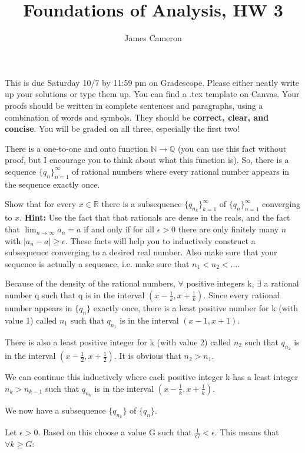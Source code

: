 \documentclass[answers]{exam}
\title{Foundations of Analysis, HW 3}
\author{James Cameron}
\date{}
\theoremstyle{remark}
\theoremstyle{definition}
\newcommand{\NN}{\mathbb{N}}
\newcommand{\RR}{\mathbb{R}}
\newcommand{\QQ}{\mathbb{Q}}
\begin{document}
This is due Saturday 10/7 by 11:59 pm on Gradescope. Please either neatly write up your solutions or type them up. You can find a .tex template on Canvas. Your proofs should be written in complete sentences and paragraphs, using a combination of words and symbols. They should be \textbf{correct, clear, and concise}. You will be graded on all three, especially the first two!

\noindent


\begin{questions}

\question There is a one-to-one and onto function $\NN \to \QQ$ (you can use this fact without proof, but I encourage you to think about what this function is). So, there is a sequence $\{q_n\}_{n=1}^{\infty}$ of rational numbers where every rational number appears in the sequence exactly once. 

Show that for every $x \in \RR$ there is a subsequence $\{q_{n_k}\}_{k=1}^{\infty}$ of $\{q_n\}_{n=1}^{\infty}$ converging to $x$. \textbf{Hint:} Use the fact that that rationals are dense in the reals, and the fact that $\lim_{ n \to \infty} a_n=a$ if and only if for all $\epsilon>0$ there are only finitely many $n$ with $|a_n-a|\ge \epsilon$. These facts will help you  to inductively construct a subsequence converging to a desired real number. Also make sure that your sequence is actually a sequence, i.e. make sure that $n_1<n_2< \dots$.

\begin{solution}

Because of the density of the rational numbers,
$\forall$ positive integers k, $\exists$ a rational number
q such that q is in the interval $(x - \frac{1}{k}, x + \frac{1}{k})$.
Since every rational number appears in $\{q_n\}$ exactly once,
there is a least positive number for k (with value 1) called $n_1$ such that
$q_{n_1}$ is in the interval $(x-1, x+1)$.

There is also a least positive integer for k (with value 2)
called $n_2$ such that $q_{n_2}$ is in the interval $(x-\frac{1}{2}, x+\frac{1}{2})$.
It is obvious that $n_2 > n_1$.

We can continue this inductively where each positive integer k
has a least integer $n_k > n_{k-1}$
such that $q_{n_k}$ is in the interval $(x - \frac{1}{k}, x + \frac{1}{k})$.

We now have a subsequence $\{q_{n_k}\}$ of $\{q_n\}$.

Let $\epsilon > 0$. Based on this choose a value G such that $\frac{1}{G} < \epsilon$.
This means that $\forall k \geq G$:


\end{solution}
\end{questions}
\end{document}
